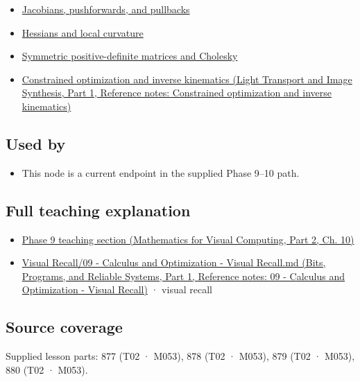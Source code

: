 \begin{itemize}
\tightlist
\item
  \hyperref[appendix-d8a7ddb675eb]{Jacobians, pushforwards, and pullbacks}
\item
  \hyperref[appendix-6ac071f8b50c]{Hessians and local curvature}
\item
  \hyperref[appendix-50d2ea3c9b26]{Symmetric positive-definite matrices and Cholesky}
\item
  \href{../04-Light-Transport-and-Image-Synthesis-P01/main.pdf\#nameddest=appendix-29f4bea4c2bb}{Constrained optimization and inverse kinematics (Light Transport and Image Synthesis, Part 1, Reference notes: Constrained optimization and inverse kinematics)}
\end{itemize}

\subsection{Used by}\label{appendix-2c2df8345991-used-by}

\hypertarget{appendix-2c2df8345991-used-by}{}

\begin{itemize}
\tightlist
\item
  This node is a current endpoint in the supplied Phase 9--10 path.
\end{itemize}

\subsection{Full teaching explanation}\label{appendix-2c2df8345991-full-teaching-explanation}

\hypertarget{appendix-2c2df8345991-full-teaching-explanation}{}

\begin{itemize}
\tightlist
\item
  \href{../02-Mathematics-for-Visual-Computing-P02/main.pdf\#nameddest=02-foundations-ii-ch026-optimization-and-inverse-problems}{Phase 9 teaching section (Mathematics for Visual Computing, Part 2, Ch. 10)}
\item
  \href{../01-Bits-Programs-and-Reliable-Systems-P01/main.pdf\#nameddest=appendix-adf48f5dc5c1}{Visual Recall/09 - Calculus and Optimization - Visual Recall.md (Bits, Programs, and Reliable Systems, Part 1, Reference notes: 09 - Calculus and Optimization - Visual Recall)} · visual recall
\end{itemize}

\subsection{Source coverage}\label{appendix-2c2df8345991-source-coverage}

\hypertarget{appendix-2c2df8345991-source-coverage}{}

Supplied lesson parts: 877 (T02 · M053), 878 (T02 · M053), 879 (T02 · M053), 880 (T02 · M053).

